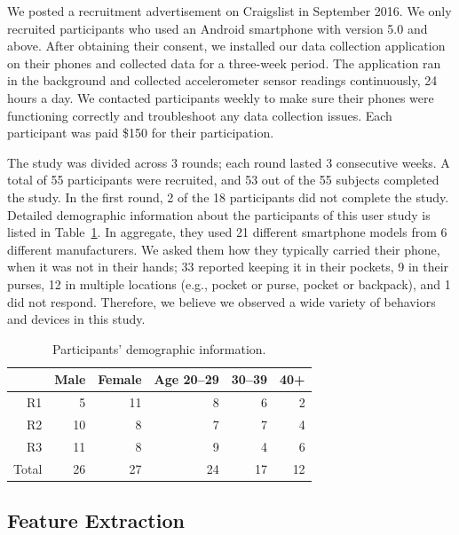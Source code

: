 We posted a recruitment advertisement on Craigslist in September 2016. 
We only recruited participants who used an Android smartphone with version 5.0 and above.
After obtaining their consent, we installed our data collection application on their phones and collected data for a three-week period.
The application ran in the background and collected accelerometer sensor readings continuously, 24 hours a day.
We contacted participants weekly to make sure their phones were functioning correctly and troubleshoot any data collection issues.
Each participant was paid \$150 for their participation.

The study was divided across 3 rounds; each round lasted 3 consecutive weeks. 
A total of 55 participants were recruited, and
53 out of the 55 subjects completed the study. 
In the first round, 2 of the 18 participants did not complete the study.
Detailed demographic information about the participants of this user study is listed in Table~\ref{tbl:demographics}.
In aggregate, they used 21 different smartphone models from 6 different manufacturers.
We asked them how they typically carried their phone, when it was not in their hands; 33 reported keeping it in their pockets, 9 in their purses, 12 in multiple locations (e.g., pocket or purse, pocket or backpack), and 1 did not respond.
Therefore, we believe we observed a wide variety of behaviors and devices in this study.

\begin{table}[H]
\centering
\begin{tabular}{rrrrrr}
\hline
      & Male & Female & Age 20--29 & 30--39 & 40+ \\ \hline
R1    & 5    & 11     & 8         & 6     & 2   \\
R2    & 10   & 8      & 7         & 7     & 4   \\
R3    & 11   & 8      & 9         & 4     & 6   \\
Total & 26   & 27     & 24        & 17    & 12  \\ \hline
\end{tabular}
\caption{Participants' demographic information.}
\label{tbl:demographics}
\end{table}




\subsection{Feature Extraction}
\label{s:features}

